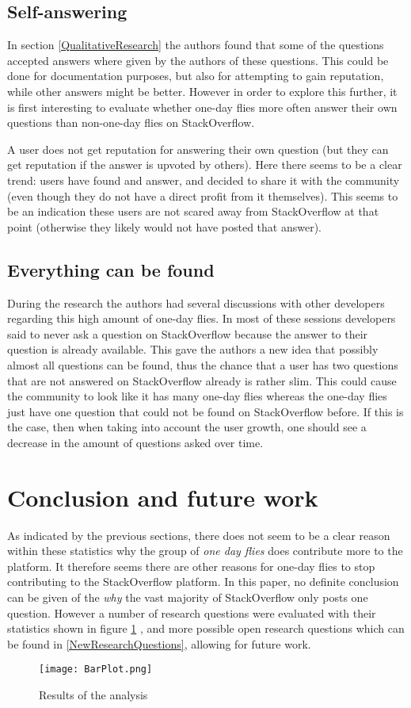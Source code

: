 \documentclass[conference]{IEEEtran}
\begin{document}
\subsection{Self-answering}
In section \ref{QualitativeResearch}  the authors found that some of the
questions accepted answers where given by the authors of these questions. This
could be done for documentation purposes, but also for attempting to gain
reputation, while other answers might be better. However in order to explore
this further, it is first interesting to evaluate whether one-day flies more
often answer their own questions than non-one-day flies on StackOverflow.

A user does not get reputation for answering their own question (but they can
get reputation if the answer is upvoted by others). Here there seems to be a
clear trend: users have found and answer, and decided to share it with the
community (even though they do not have a direct profit from it themselves).
This seems to be an indication these users are not scared away from
StackOverflow at that point (otherwise they likely would not have posted that
answer). 

\subsection{Everything can be found}
During the research the authors had several discussions with other developers
regarding this high amount of one-day flies. In most of these sessions
developers said to never ask a question on StackOverflow because the answer to
their question is already available. This gave the authors a new idea that
possibly almost all questions can be found, thus the chance that a user has two
questions that are not answered on StackOverflow already is rather slim. This
could cause the community to look like it has many one-day flies whereas the
one-day flies just have one question that could not be found on StackOverflow
before. If this is the case, then when taking into account the user growth, one
should see a decrease in the amount of questions asked over time. 

\section{Conclusion and future work}

As indicated by the previous sections, there does not seem to be a clear reason
within these statistics why the group of \textit{one day flies} does contribute
more to the platform. It therefore seems there are other reasons for one-day
flies to stop contributing to the StackOverflow platform. In this paper, no
definite conclusion can be given of the \textit{why} the vast majority of
StackOverflow only posts one question. However a number of research questions
were evaluated with their statistics shown in figure \ref{finalResults} , and
more possible open research questions which can be found in
\ref{NewResearchQuestions}, allowing for future work.

\begin{figure}[h]
 \texttt{[image: BarPlot.png]}
 \caption{Results of the analysis}
 \label{finalResults}
\end{figure}





\end{document}
